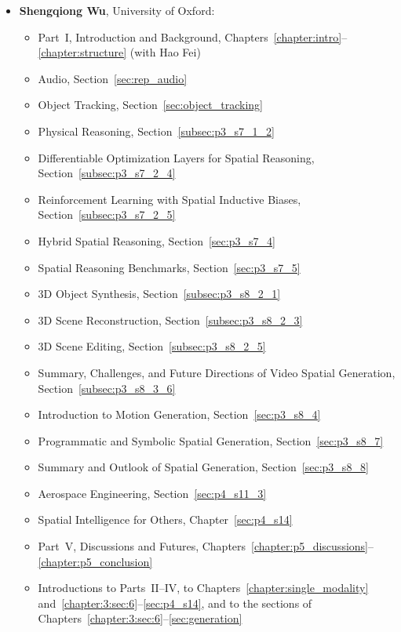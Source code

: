 \begin{itemize}[leftmargin=*]
    \item \textbf{Shengqiong Wu}, University of Oxford:
        \begin{itemize}
            \item Part~I, Introduction and Background, Chapters~\ref{chapter:intro}--\ref{chapter:structure} (with Hao Fei)
            \item Audio, Section~\ref{sec:rep_audio}
            \item Object Tracking, Section~\ref{sec:object_tracking}
            \item Physical Reasoning, Section~\ref{subsec:p3_s7_1_2}
            \item Differentiable Optimization Layers for Spatial Reasoning, Section~\ref{subsec:p3_s7_2_4}
            \item Reinforcement Learning with Spatial Inductive Biases, Section~\ref{subsec:p3_s7_2_5}
            \item Hybrid Spatial Reasoning, Section~\ref{sec:p3_s7_4}
            \item Spatial Reasoning Benchmarks, Section~\ref{sec:p3_s7_5}
            \item 3D Object Synthesis, Section~\ref{subsec:p3_s8_2_1}
            \item 3D Scene Reconstruction, Section~\ref{subsec:p3_s8_2_3}
            \item 3D Scene Editing, Section~\ref{subsec:p3_s8_2_5}
            \item Summary, Challenges, and Future Directions of Video Spatial Generation, Section~\ref{subsec:p3_s8_3_6}
            \item Introduction to Motion Generation, Section~\ref{sec:p3_s8_4}
            \item Programmatic and Symbolic Spatial Generation, Section~\ref{sec:p3_s8_7}
            \item Summary and Outlook of Spatial Generation, Section~\ref{sec:p3_s8_8}
            \item Aerospace Engineering, Section~\ref{sec:p4_s11_3}
            \item Spatial Intelligence for Others, Chapter~\ref{sec:p4_s14}
            \item Part~V, Discussions and Futures, Chapters~\ref{chapter:p5_discussions}--\ref{chapter:p5_conclusion}
            \item Introductions to Parts~II--IV, to Chapters~\ref{chapter:single_modality} and~\ref{chapter:3:sec:6}--\ref{sec:p4_s14}, and to the sections of Chapters~\ref{chapter:3:sec:6}--\ref{sec:generation}

\end{itemize}
\end{itemize}

